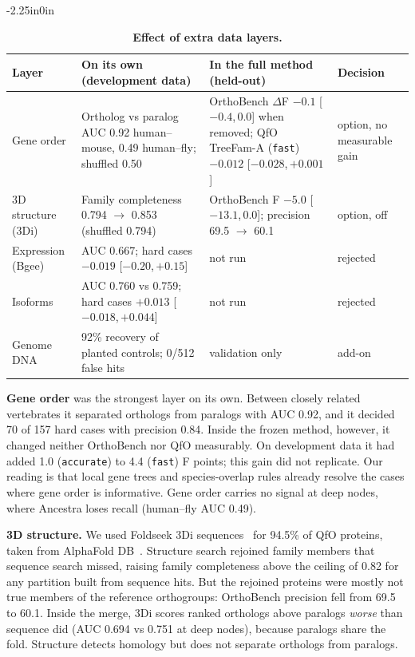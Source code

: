 \documentclass[10pt,letterpaper]{article}
\newcommand{\CI}[2]{[#1,\,#2]}
\begin{document}
\begin{table}[!ht]
\begin{adjustwidth}{-2.25in}{0in}
\centering
\caption{{\bf Effect of extra data layers.}}
\begin{tabular}{p{2.3cm}p{4.6cm}p{3.8cm}p{2.0cm}}
\hline
Layer & On its own (development data) & In the full method (held-out) & Decision\\
\hline
Gene order & Ortholog vs paralog AUC 0.92 human--mouse, 0.49 human--fly; shuffled 0.50 & OrthoBench $\Delta$F $-0.1$ \CI{$-0.4$}{$0.0$} when removed; QfO TreeFam-A (\texttt{fast}) $-0.012$ \CI{$-0.028$}{$+0.001$} & option, no measurable gain\\
3D structure (3Di) & Family completeness 0.794 $\to$ 0.853 (shuffled 0.794) & OrthoBench F $-5.0$ \CI{$-13.1$}{$0.0$}; precision 69.5 $\to$ 60.1 & option, off\\
Expression (Bgee) & AUC 0.667; hard cases $-0.019$ \CI{$-0.20$}{$+0.15$} & not run & rejected\\
Isoforms & AUC 0.760 vs 0.759; hard cases $+0.013$ \CI{$-0.018$}{$+0.044$} & not run & rejected\\
Genome DNA & 92\% recovery of planted controls; 0/512 false hits & validation only & add-on\\
\hline
\end{tabular}
\label{tab:layers}
\end{adjustwidth}
\end{table}

\textbf{Gene order} was the strongest layer on its own. Between closely related vertebrates it separated orthologs from paralogs with AUC 0.92, and it decided 70 of 157 hard cases with precision 0.84. Inside the frozen method, however, it changed neither OrthoBench nor QfO measurably. On development data it had added 1.0 (\texttt{accurate}) to 4.4 (\texttt{fast}) F points; this gain did not replicate. Our reading is that local gene trees and species-overlap rules already resolve the cases where gene order is informative. Gene order carries no signal at deep nodes, where Ancestra loses recall (human--fly AUC 0.49).

\textbf{3D structure.} We used Foldseek 3Di sequences~\cite{vankempen2024foldseek} for 94.5\% of QfO proteins, taken from AlphaFold DB~\cite{varadi2024alphafolddb}. Structure search rejoined family members that sequence search missed, raising family completeness above the ceiling of 0.82 for any partition built from sequence hits. But the rejoined proteins were mostly not true members of the reference orthogroups: OrthoBench precision fell from 69.5 to 60.1. Inside the merge, 3Di scores ranked orthologs above paralogs \emph{worse} than sequence did (AUC 0.694 vs 0.751 at deep nodes), because paralogs share the fold. Structure detects homology but does not separate orthologs from paralogs.
\end{document}
